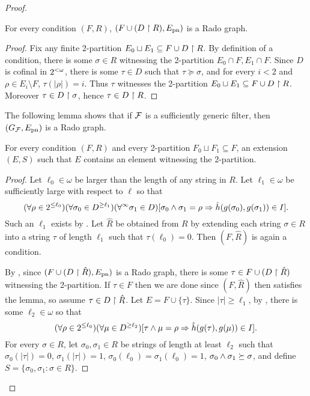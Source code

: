 \begin{proof}
\begin{lemma}\label{lem:weak-rado-cone-avoidance-condition-is-rado}
For every condition $(F, R)$, $(F \cup (D \upharpoonright R), E_{\mathrm{pn}})$ is a Rado graph.	
\end{lemma}
\begin{proof}
Fix any finite 2-partition  $E_0 \sqcup E_1 \subseteq F \cup D \upharpoonright R$.
By definition of a condition, there is some $\sigma \in R$ witnessing the 2-partition $E_0 \cap F, E_1 \cap F$. Since $D$ is cofinal in ${2^{<\omega}}$, there is some $\tau \in D$ such that $\tau \succeq \sigma$, and for every $i < 2$ and $\rho \in E_i \setminus F$, $\tau(|\rho|) = i$. 
Thus $\tau$ witnesses the 2-partition $E_0 \sqcup E_1 \subseteq F \cup D \upharpoonright R$. Moreover $\tau \in D \upharpoonright \sigma$, hence $\tau \in D \upharpoonright R$.
\end{proof}

The following lemma shows that if $\mathcal{F}$ is a sufficiently generic filter, then $(G_{\mathcal{F}}, E_{\mathrm{pn}})$ is a Rado graph.

\begin{lemma}\label{lem:weak-rado-cone-avoidance-progress}
For every condition $(F, R)$ and every 2-partition $F_0 \sqcup F_1 \subseteq F$,
an extension $(E, S)$ such that $E$ contains an element witnessing the 2-partition.
\end{lemma}
\begin{proof}
Let $\ell_0 \in \omega$ be larger than the length of any string in $R$.
Let $\ell_1 \in \omega$ be sufficiently large with respect to $\ell$ so that
\begin{equation}\label{eqn:weak-rado-pairs-ca-3}
(\forall \rho \in 2^{\leq \ell_0})(\forall \sigma_0 \in D^{\geq \ell_1})(\forall^{\infty} \sigma_1 \in D)[\sigma_0 \wedge \sigma_1 = \rho \Rightarrow \hat{h}(g(\sigma_0), g(\sigma_1)) \in I].
\end{equation}
Such an $\ell_1$ exists by .
Let $\hat{R}$ be obtained from $R$ by extending each string $\sigma \in R$ into a string $\tau$ of length $\ell_1$ such that $\tau(\ell_0) = 0$.
Then $(F, \hat{R})$ is again a condition.

By , since $(F \cup (D \upharpoonright \hat{R}), E_{\mathrm{pn}})$ is a Rado graph, there is some $\tau \in F \cup (D \upharpoonright \hat{R})$ witnessing the 2-partition.
If $\tau \in F$ then we are done since $(F, \hat{R})$ then satisfies the lemma, so assume $\tau \in D \upharpoonright \hat{R}$. %
Let $E = F \cup \{\tau\}$. Since $|\tau| \geq \ell_1$, by , there is some $\ell_2 \in \omega$ so that
\begin{equation}\label{eqn:weak-rado-pairs-ca-4}
(\forall \rho \in 2^{\leq \ell_0})(\forall \mu \in D^{\geq \ell_2})[\tau \wedge \mu = \rho \Rightarrow \hat{h}(g(\tau), g(\mu)) \in I].
\end{equation}
For every $\sigma \in R$, let $\sigma_0, \sigma_1 \in R$ be strings of length at least $\ell_2$ such that $\sigma_0(|\tau|) = 0$, $\sigma_1(|\tau|) = 1$, $\sigma_0(\ell_0) = \sigma_1(\ell_0) = 1$, $\sigma_0 \wedge \sigma_1 \succeq \sigma$, and define $S = \{\sigma_0, \sigma_1: \sigma \in R \}$.


\end{proof}
\end{proof}
